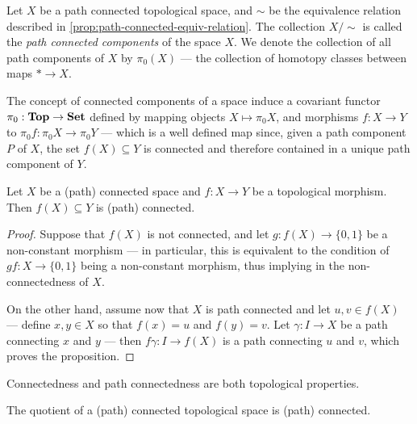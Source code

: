 \begin{definition}
\label{def:path-connected-components}
Let \(X\) be a path connected topological space, and \(\sim\) be the equivalence
relation described in \cref{prop:path-connected-equiv-relation}. The collection
\(X/{\sim}\) is called the \emph{path connected components} of the space
\(X\). We denote the collection of all path components of \(X\) by \(\pi_0(X)\)
--- the collection of homotopy classes between maps \(* \to X\).
\end{definition}

\begin{definition}[\(\pi_0\) functor]
\label{def:pi0-functor}
The concept of connected components of a space induce a covariant functor
\(\pi_0: {\textbf{Top}} \to {\textbf{Set}}\) defined by mapping objects \(X \mapsto \pi_0 X\), and
morphisms \(f: X \to Y\) to \(\pi_0 f: \pi_0 X \to \pi_0 Y\) --- which is a well
defined map since, given a path component \(P\) of \(X\), the set \(f(X)
\subseteq Y\) is connected and therefore contained in a unique path component of
\(Y\).
\end{definition}

\begin{theorem}
\label{thm:morphisms-preserve-connectivity}
Let \(X\) be a (path) connected space and \(f: X \to Y\) be a topological
morphism. Then \(f(X) \subseteq Y\) is (path) connected.
\end{theorem}

\begin{proof}
Suppose that \(f(X)\) is not connected, and let \(g: f(X) \to \{0, 1\}\) be a
non-constant morphism --- in particular, this is equivalent to the condition of
\(gf: X \to \{0, 1\}\) being a non-constant morphism, thus implying in the
non-connectedness of \(X\).

On the other hand, assume now that \(X\) is path connected and let
\(u, v \in f(X)\) --- define \(x, y \in X\) so that \(f(x) = u\) and
\(f(y) = v\). Let \(\gamma: I \to X\) be a path connecting \(x\) and \(y\) ---
then \(f\gamma: I \to f(X)\) is a path connecting \(u\) and \(v\), which proves
the proposition.
\end{proof}

\begin{corollary}
\label{cor:connectedness-top-property}
Connectedness and path connectedness are both topological properties.
\end{corollary}

\begin{corollary}
\label{cor:quotient-path-connected-is-path-connected}
The quotient of a (path) connected topological space is (path) connected.
\end{corollary}

